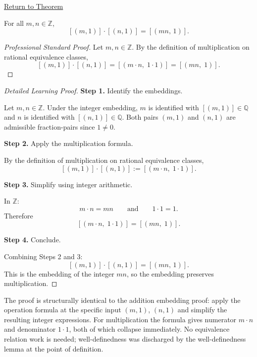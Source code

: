 \newpage
{}
\label{prf:ec-integer-embedding-mul}

\begin{remark*}[Return]
\hyperref[thm:ec-integer-embedding-mul]{Return to Theorem}
\end{remark*}

\begin{theorem*}
For all $m,n\in\mathbb{Z}$,
\[
[(m,1)] \cdot [(n,1)] = [(mn,\,1)].
\]
\end{theorem*}

\begin{proof}[Professional Standard Proof]
\LRAProofBodyStart
Let $m,n\in\mathbb{Z}$.  By the definition of multiplication on rational
equivalence classes,
\[
[(m,1)] \cdot [(n,1)]
= [(m\cdot n,\; 1\cdot 1)]
= [(mn,\; 1)].
\]
\end{proof}

\begin{proof}[Detailed Learning Proof]
\LRAProofBodyStart

\textbf{Step 1.} Identify the embeddings.

Let $m,n\in\mathbb{Z}$.  Under the integer embedding, $m$ is identified
with $[(m,1)]\in\mathbb{Q}$ and $n$ is identified with $[(n,1)]\in\mathbb{Q}$.
Both pairs $(m,1)$ and $(n,1)$ are admissible fraction-pairs since $1\neq 0$.

\textbf{Step 2.} Apply the multiplication formula.

By the definition of multiplication on rational equivalence classes,
\[
[(m,1)] \cdot [(n,1)]
:= [(m\cdot n,\; 1\cdot 1)].
\]

\textbf{Step 3.} Simplify using integer arithmetic.

In $\mathbb{Z}$:
\[
m\cdot n = mn
\qquad\text{and}\qquad
1\cdot 1 = 1.
\]
Therefore
\[
[(m\cdot n,\; 1\cdot 1)] = [(mn,\; 1)].
\]

\textbf{Step 4.} Conclude.

Combining Steps 2 and 3:
\[
[(m,1)] \cdot [(n,1)] = [(mn,\,1)].
\]
This is the embedding of the integer $mn$, so the embedding preserves
multiplication.
\end{proof}

\begin{remark*}
The proof is structurally identical to the addition embedding proof: apply
the operation formula at the specific input $(m,1)$, $(n,1)$ and simplify
the resulting integer expressions.  For multiplication the formula gives
numerator $m\cdot n$ and denominator $1\cdot 1$, both of which collapse
immediately.  No equivalence relation work is needed; well-definedness was
discharged by the well-definedness lemma at the point of definition.
\end{remark*}

